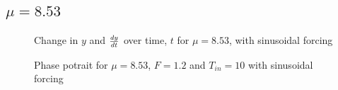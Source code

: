 \documentclass{article}
\begin{document}
\subsection{$\mu=8.53$}
\begin{figure}[H]
\centering 
\noindent{}%
\caption{Change in $y$ and $dy \over dt$  over time, $t$ for $\mu=8.53$, with sinusoidal forcing}
\end{figure}
\begin{figure}[H]
\centering 
\noindent{}%
\caption{Phase potrait for $\mu=8.53$, $F=1.2$ and $T_{in}=10$ with sinusoidal forcing}
\end{figure}
\end{document}

